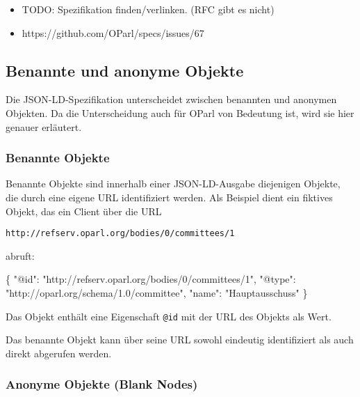 \documentclass[,a4paper]{article}
\newenvironment{Shaded}{}{}
\newcommand{\DataTypeTok}[1]{\textcolor[rgb]{0.56,0.13,0.00}{{#1}}}
\newcommand{\StringTok}[1]{\textcolor[rgb]{0.25,0.44,0.63}{{#1}}}
\newcommand{\NormalTok}[1]{{#1}}
\begin{document}
\begin{itemize}
\itemsep1pt\parskip0pt
\item
  TODO: Spezifikation finden/verlinken. (RFC gibt es nicht)
\item
  https://github.com/OParl/specs/issues/67
\end{itemize}

\subsection{Benannte und anonyme
Objekte}\label{benannte-und-anonyme-objekte}

Die JSON-LD-Spezifikation unterscheidet zwischen benannten und anonymen
Objekten. Da die Unterscheidung auch für OParl von Bedeutung ist, wird
sie hier genauer erläutert.

\subsubsection{Benannte Objekte}\label{benannte-objekte}

Benannte Objekte sind innerhalb einer JSON-LD-Ausgabe diejenigen
Objekte, die durch eine eigene URL identifiziert werden. Als Beispiel
dient ein fiktives Objekt, das ein Client über die URL

\begin{verbatim}
http://refserv.oparl.org/bodies/0/committees/1
\end{verbatim}

abruft:

\begin{Shaded}
\begin{Highlighting}[]
\NormalTok{\{}
    \DataTypeTok{"@id"}\NormalTok{: }\StringTok{"http://refserv.oparl.org/bodies/0/committees/1"}\NormalTok{,}
    \DataTypeTok{"@type"}\NormalTok{: }\StringTok{"http://oparl.org/schema/1.0/committee"}\NormalTok{,}
    \DataTypeTok{"name"}\NormalTok{: }\StringTok{"Hauptausschuss"}
\NormalTok{\}}
\end{Highlighting}
\end{Shaded}

Das Objekt enthält eine Eigenschaft \texttt{@id} mit der URL des Objekts
als Wert.

Das benannte Objekt kann über seine URL sowohl eindeutig identifiziert
als auch direkt abgerufen werden.

\subsubsection{Anonyme Objekte (Blank
Nodes)}\label{anonyme-objekte-blank-nodes}
\end{document}
